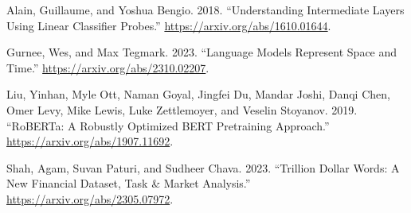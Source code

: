 \documentclass[
  letterpaper,
  DIV=11,
  numbers=noendperiod]{scrartcl}
\newlength{\cslhangindent}
\newenvironment{CSLReferences}[2] %
 {\begin{list}{}{%
  \setlength{\itemindent}{0pt}
  \setlength{\leftmargin}{0pt}
  \setlength{\parsep}{0pt}
  \ifodd #1
   \setlength{\leftmargin}{\cslhangindent}
   \setlength{\itemindent}{-1\cslhangindent}
  \fi
  \setlength{\itemsep}{#2\baselineskip}}}
 {\end{list}}
\theoremstyle{plain}
\theoremstyle{remark}
\begin{document}
\label{refs}
\begin{CSLReferences}{1}{0}
Alain, Guillaume, and Yoshua Bengio. 2018. {``Understanding Intermediate
Layers Using Linear Classifier Probes.''}
\url{https://arxiv.org/abs/1610.01644}.

Gurnee, Wes, and Max Tegmark. 2023. {``Language Models Represent Space
and Time.''} \url{https://arxiv.org/abs/2310.02207}.

Liu, Yinhan, Myle Ott, Naman Goyal, Jingfei Du, Mandar Joshi, Danqi
Chen, Omer Levy, Mike Lewis, Luke Zettlemoyer, and Veselin Stoyanov.
2019. {``RoBERTa: A Robustly Optimized BERT Pretraining Approach.''}
\url{https://arxiv.org/abs/1907.11692}.

Shah, Agam, Suvan Paturi, and Sudheer Chava. 2023. {``Trillion Dollar
Words: A New Financial Dataset, Task \& Market Analysis.''}
\url{https://arxiv.org/abs/2305.07972}.

\end{CSLReferences}
\end{document}
